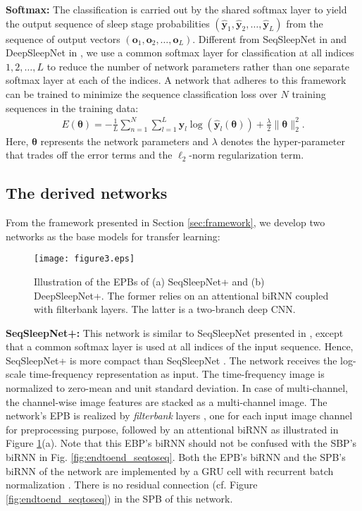 \documentclass[journal,twoside,web]{ieeecolor}
\begin{document}
{\bf Softmax:} The classification is carried out by the shared softmax layer to yield the output sequence of sleep stage probabilities $(\mathbf{\hat{y}}_1, \mathbf{\hat{y}}_2, \ldots,\mathbf{\hat{y}}_L)$ from the sequence of output vectors $(\mathbf{o}_1, \mathbf{o}_2, \ldots, \mathbf{o}_L)$. Different from SeqSleepNet in \cite{Phan2019a} and DeepSleepNet in \cite{Supratak2017}, we use a common softmax layer for classification at all indices $1, 2, \ldots, L$ to reduce the number of network parameters rather than one separate softmax layer at each of the indices.
A network that adheres to this framework can be trained to minimize the sequence classification loss over $N$ training sequences in the training data:
\begin{align}
E(\bm{\theta}) = -\frac{1}{L}\sum_{n=1}^{N}\sum_{l=1}^{L} \mathbf{y}_l\log\left(\mathbf{\hat{y}}_l\left(\bm{\theta}\right)\right) + \frac{\lambda}{2}\|\bm{\theta}\|^2_2.
\label{eq:sequence_loss}
\end{align}
Here, $\bm{\theta}$ represents the network parameters and $\lambda$ denotes the hyper-parameter that trades off the error terms and the $\ell_2$-norm regularization term.

\vspace{-0.2cm}
\subsection{The derived networks}
From the framework presented in Section \ref{sec:framework}, we develop two networks as the base models for transfer learning:

\begin{figure} [!t]
	\centering
	\texttt{[image: figure3.eps]}
	\vspace{-0.1cm}
	\caption{Illustration of the EPBs of (a) SeqSleepNet+ and (b) DeepSleepNet+. The former relies on an attentional biRNN coupled with filterbank layers. The latter is a two-branch deep CNN.}
	\label{fig:EFE}
	\vspace{-0.25cm}
\end{figure}

{\bf SeqSleepNet+:} This network is similar to SeqSleepNet presented in \cite{Phan2019a}, except that a common softmax layer is used at all indices of the input sequence. Hence, SeqSleepNet+ is more compact than SeqSleepNet \cite{Phan2019a}. The network receives the log-scale time-frequency representation \cite{Phan2019a} as input. The time-frequency image is normalized to zero-mean and unit standard deviation. In case of multi-channel, the channel-wise image features are stacked as a multi-channel image. The network's EPB is realized by \emph{filterbank} layers \cite{phan2018c, Phan2019a}, one for each input image channel for preprocessing purpose, followed by an attentional biRNN as illustrated in Figure \ref{fig:EFE}(a). Note that this EBP's biRNN should not be confused with the SBP's biRNN in Fig. \ref{fig:endtoend_seqtoseq}. Both the EPB's biRNN and the SPB's biRNN of the network are implemented by a GRU cell \cite{Cho2014} with recurrent batch normalization \cite{Cooijmans2016}. There is no residual connection (cf. Figure \ref{fig:endtoend_seqtoseq}) in the SPB of this network.
\end{document}
